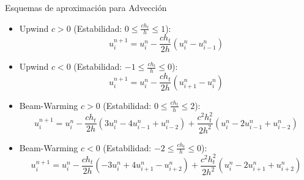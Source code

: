 \documentclass[handout]{beamer}
\begin{document}
\begin{frame}{Esquemas de aproximaci\'on para Advecci\'on }

\begin{itemize}[<+->]
	\item Upwind $c > 0$ (Estabilidad: $0 \leq \frac{c h_t}{h} \leq 1$): 
\begin{displaymath}
u_{i}^{n+1} = u_{i}^{n} - \dfrac{c h_t}{2 h}\left(u_{i}^{n} - u_{i-1}^{n} \right)
\end{displaymath}	
	\item Upwind $c < 0$ (Estabilidad: $-1 \leq \frac{c h_t}{h} \leq 0$): 
\begin{displaymath}
u_{i}^{n+1} = u_{i}^{n} - \dfrac{c h_t}{2 h}\left(u_{i+1}^{n} - u_{i}^{n} \right)
\end{displaymath}
	\item Beam-Warming $c > 0$ (Estabilidad: $0 \leq \frac{c h_t}{h} \leq 2$): 
\begin{displaymath}
u_{i}^{n+1} = u_{i}^{n} - \dfrac{c h_t}{2 h}\left(3u_{i}^{n} -4 u_{i-1}^{n} + u_{i-2}^n\right) + \dfrac{c^2 h_t^2}{2 h^2}\left(u_{i}^{n} - 2u_{i-1}^{n} + u_{i-2}^{n} \right)
\end{displaymath}	
	\item Beam-Warming $c < 0$ (Estabilidad: $-2 \leq \frac{c h_t}{h} \leq 0$): 
\begin{displaymath}
u_{i}^{n+1} = u_{i}^{n} - \dfrac{c h_t}{2 h}\left(-3u_{i}^{n} +4 u_{i+1}^{n} - u_{i+2}^n\right) + \dfrac{c^2 h_t^2}{2 h^2}\left(u_{i}^{n} - 2u_{i+1}^{n} + u_{i+2}^{n} \right)
\end{displaymath}	

\end{itemize}

\end{frame}
\end{document}
